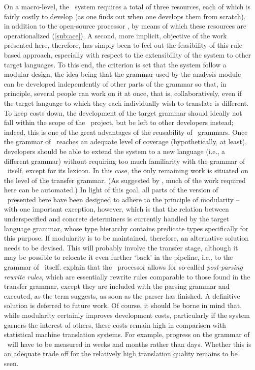 On a macro-level, the \depicto\ system requires a total of three resources,
each of which is fairly costly to develop (as one finds out when one develops
them from scratch), in addition to the open-source processor \ace, by means of
which these resources are operationalized (\cref{sub:ace}). A second, more
implicit, objective of the work presented here, therefore, has simply been to
feel out the feasibility of this rule-based approach, especially with respect
to the extensibility of the system to other target languages. To this end, the
criterion is set that the system follow a modular design, the idea being that
the grammar used by the analysis module can be developed independently of other
parts of the grammar so that, in principle, several people can work on it at
once, that is, collaboratively, even if the target language to which they each
individually wish to translate is different. To keep costs down, the
development of the target grammar should ideally not fall within the scope of
the \depicto\ project, but be left to other developers instead; indeed, this is
one of the great advantages of the reusability of \delphin\ grammars. Once the
grammar of \sclera\ reaches an adequate level of coverage (hypothetically, at
least), developers should be able to extend the system to a new language (i.e.,
a different grammar) without requiring too much familiarity with the grammar of
\sclera\ itself, except for its lexicon. In this case, the only remaining work
is situated on the level of the transfer grammar. (As suggested by
\citet{bond2011deep}, much of the work required here can be automated.) In
light of this goal, all parts of the version of \depicto\ presented here have
been designed to adhere to the principle of modularity -- with one important
exception, however, which is that the relation between underspecified and
concrete determiners is currently handled by the target language grammar, whose
type hierarchy contains predicate types specifically for this purpose. If
modularity is to be maintained, therefore, an alternative solution needs to be
devised. This will probably involve the transfer stage, although it may be
possible to relocate it even further `back' in the pipeline, i.e., to the
grammar of \sclera\ itself. \citet{crysmann2012towards} explain that the \ace\
processor allows for so-called \emph{post-parsing rewrite rules}, which are
essentially rewrite rules comparable to those found in the transfer grammar,
except they are included with the parsing grammar and executed, as the term
suggests, as soon as the parser has finished. A definitive solution is deferred
to future work. Of course, it should be borne in mind that, while modularity
certainly improves development costs, particularly if the system garners the
interest of others, these costs remain high in comparison with statistical
machine translation systems. For example, progress on the grammar of \sclera\
will have to be measured in weeks and months rather than days. Whether this is
an adequate trade off for the relatively high translation quality remains to be
seen.

